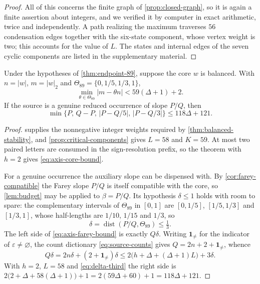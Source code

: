\begin{proof}
All of this concerns the finite graph of \cref{prop:closed-graph}, so it
is again a finite assertion about integers, and we verified it by
computer in exact arithmetic, twice and independently. A path realizing
the maximum traverses $56$ condensation edges together with the
six-state component, whose vertex weight is two; this accounts for the
value of $L$. The states and internal edges of the seven cyclic
components are listed in the supplementary material.
\end{proof}

\begin{theorem}
\label{thm:axis-stability}
Under the hypotheses of \cref{thm:endpoint-89}, suppose the core $w$ is
balanced. With $n=|w|$, $m=|w|_2$ and
$\Theta_{89}=\{0,1/5,1/3,1\}$,
\begin{equation}
 \min_{\theta\in\Theta_{89}}|m-\theta n|
 <59(\Delta+1)+2.
 \label{eq:axis-core-bound}
\end{equation}
If the source is a genuine reduced occurrence of slope $P/Q$, then
\begin{equation}
 \min\{P,\,Q-P,\,|P-Q/5|,\,|P-Q/3|\}\leqslant118\Delta+121.
 \label{eq:axis-farey-bound}
\end{equation}
\end{theorem}

\begin{proof}
 supplies the nonnegative integer weights
required by \cref{thm:balanced-stability}, and
\cref{prop:critical-components} gives $L=58$ and $K=59$. At most two paired
letters are consumed in the sign-resolution prefix, so the theorem with
$h=2$ gives \eqref{eq:axis-core-bound}.

For a genuine occurrence the auxiliary slope can be dispensed with. By
\cref{cor:farey-compatible} the Farey slope $P/Q$ is itself compatible with
the core, so \cref{lem:budget} may be applied to $\beta=P/Q$. Its hypothesis
$\delta\leqslant1$ holds with room to spare: the complementary intervals of
$\Theta_{89}$ in $[0,1]$ are $[0,1/5]$, $[1/5,1/3]$ and $[1/3,1]$, whose
half-lengths are $1/10$, $1/15$ and $1/3$, so
\begin{equation}
 \delta=\operatorname{dist}(P/Q,\Theta_{89})\leqslant\tfrac13 .
 \label{eq:delta-third}
\end{equation}
The left side of \eqref{eq:axis-farey-bound} is exactly $Q\delta$. Writing
$\mathbf1_{\ne}$ for the indicator of $\varepsilon\ne\varnothing$, the count
dictionary \eqref{eq:source-counts} gives $Q=2n+2+\mathbf1_{\ne}$, whence
$$
 Q\delta=2n\delta+(2+\mathbf1_{\ne})\delta
 \leqslant2\bigl(h+\Delta+(\Delta+1)L\bigr)+3\delta .
$$
With $h=2$, $L=58$ and \eqref{eq:delta-third} the right side is
$2\bigl(2+\Delta+58(\Delta+1)\bigr)+1=2(59\Delta+60)+1=118\Delta+121$.
\end{proof}

